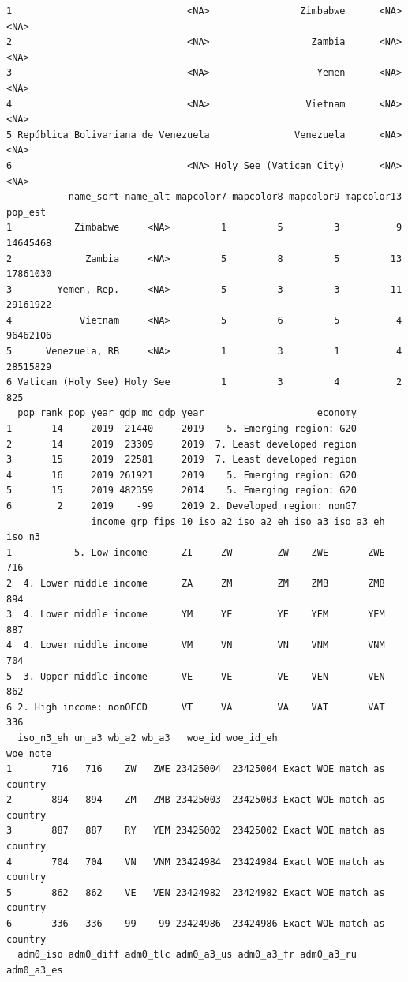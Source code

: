 \documentclass[
  letterpaper,
  DIV=11,
  numbers=noendperiod,
  oneside]{scrreprt}
\begin{document}
\begin{verbatim}
1                               <NA>                Zimbabwe      <NA>     <NA>
2                               <NA>                  Zambia      <NA>     <NA>
3                               <NA>                   Yemen      <NA>     <NA>
4                               <NA>                 Vietnam      <NA>     <NA>
5 República Bolivariana de Venezuela               Venezuela      <NA>     <NA>
6                               <NA> Holy See (Vatican City)      <NA>     <NA>
           name_sort name_alt mapcolor7 mapcolor8 mapcolor9 mapcolor13  pop_est
1           Zimbabwe     <NA>         1         5         3          9 14645468
2             Zambia     <NA>         5         8         5         13 17861030
3        Yemen, Rep.     <NA>         5         3         3         11 29161922
4            Vietnam     <NA>         5         6         5          4 96462106
5      Venezuela, RB     <NA>         1         3         1          4 28515829
6 Vatican (Holy See) Holy See         1         3         4          2      825
  pop_rank pop_year gdp_md gdp_year                    economy
1       14     2019  21440     2019    5. Emerging region: G20
2       14     2019  23309     2019  7. Least developed region
3       15     2019  22581     2019  7. Least developed region
4       16     2019 261921     2019    5. Emerging region: G20
5       15     2019 482359     2014    5. Emerging region: G20
6        2     2019    -99     2019 2. Developed region: nonG7
               income_grp fips_10 iso_a2 iso_a2_eh iso_a3 iso_a3_eh iso_n3
1           5. Low income      ZI     ZW        ZW    ZWE       ZWE    716
2  4. Lower middle income      ZA     ZM        ZM    ZMB       ZMB    894
3  4. Lower middle income      YM     YE        YE    YEM       YEM    887
4  4. Lower middle income      VM     VN        VN    VNM       VNM    704
5  3. Upper middle income      VE     VE        VE    VEN       VEN    862
6 2. High income: nonOECD      VT     VA        VA    VAT       VAT    336
  iso_n3_eh un_a3 wb_a2 wb_a3   woe_id woe_id_eh                   woe_note
1       716   716    ZW   ZWE 23425004  23425004 Exact WOE match as country
2       894   894    ZM   ZMB 23425003  23425003 Exact WOE match as country
3       887   887    RY   YEM 23425002  23425002 Exact WOE match as country
4       704   704    VN   VNM 23424984  23424984 Exact WOE match as country
5       862   862    VE   VEN 23424982  23424982 Exact WOE match as country
6       336   336   -99   -99 23424986  23424986 Exact WOE match as country
  adm0_iso adm0_diff adm0_tlc adm0_a3_us adm0_a3_fr adm0_a3_ru adm0_a3_es

\end{verbatim}
\end{document}
